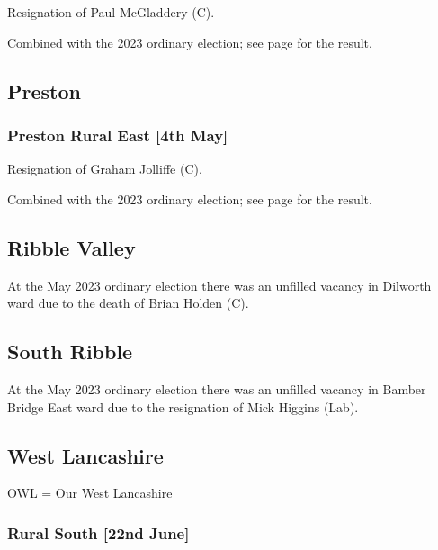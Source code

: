 \documentclass[a4paper,openany]{book}
\begin{document}
\begin{resultsiii}

Resignation of Paul McGladdery (C).

Combined with the 2023 ordinary election; see page \pageref{VivaryBridgePendle} for the result.

\subsection*{Preston}

\subsubsection*{Preston Rural East \hspace*{\fill}\nolinebreak[1]%
	\enspace\hspace*{\fill}
	[4th May]}


Resignation of Graham Jolliffe (C).

Combined with the 2023 ordinary election; see page \pageref{PrestonPrestonRuralEast} for the result.

\subsection*{Ribble Valley}

At the May 2023 ordinary election there was an unfilled vacancy in Dilworth ward due to the death of Brian Holden (C).%

\subsection*{South Ribble}

At the May 2023 ordinary election there was an unfilled vacancy in Bamber Bridge East ward due to the resignation of Mick Higgins (Lab).%

\subsection*{West Lancashire}

OWL = Our West Lancashire

\subsubsection*{Rural South \hspace*{\fill}\nolinebreak[1]%
	\enspace\hspace*{\fill}
	[22nd June]}


\end{resultsiii}
\end{document}
